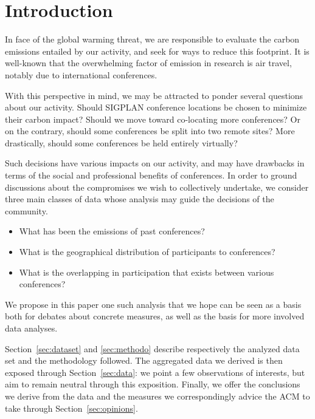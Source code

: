 \section{Introduction}

In face of the global warming threat, we are responsible to evaluate the carbon
emissions entailed by our activity, and seek for ways to reduce this footprint.
It is well-known that the overwhelming factor of emission in research is air travel,
notably due to international conferences.

With this perspective in mind, we may be attracted to ponder several questions
about our activity. Should SIGPLAN conference locations be chosen to minimize
their carbon impact? Should we move toward co-locating more conferences? Or on
the contrary, should some conferences be split into two remote sites?
More drastically, should some conferences be held entirely virtually?

Such decisions have various impacts on our activity, and may have drawbacks in
terms of the social and professional benefits of conferences. 
In order to ground discussions about the compromises we wish to collectively undertake, we consider
three main classes of data whose analysis may guide the decisions of the community.
\begin{itemize}
\item What has been the emissions of past conferences?
\item What is the geographical distribution of participants to conferences?
\item What is the overlapping in participation that exists between various conferences?
\end{itemize}

We propose in this paper one such analysis that we hope can be seen as a basis both for
debates about concrete measures, as well as the basis for more involved data analyses.

Section~\ref{sec:dataset} and \ref{sec:methodo} describe respectively the
analyzed data set and the methodology followed. The aggregated data
we derived is then exposed through Section~\ref{sec:data}: we point a few
observations of interests, but aim to remain neutral through this exposition.
Finally, we offer the conclusions we derive from the data and the measures we
correspondingly advice the ACM to take through Section~\ref{sec:opinions}.


